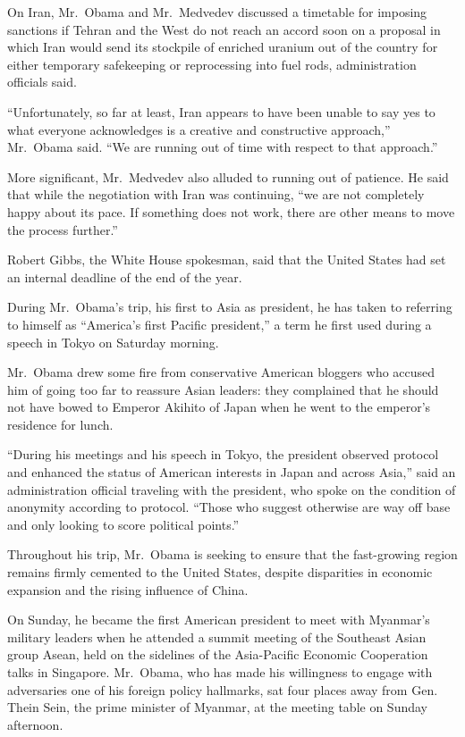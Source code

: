 ﻿\documentclass[12pt]{article}
\begin{document}
On Iran, Mr.~Obama and Mr.~Medvedev discussed a timetable for imposing sanctions if Tehran and the
West do not reach an accord soon on a proposal in which Iran would send its stockpile of enriched
uranium out of the country for either temporary safekeeping or reprocessing into fuel rods,
administration officials said.

``Unfortunately, so far at least, Iran appears to have been unable to say yes to what everyone
acknowledges is a creative and constructive approach,'' Mr.~Obama said. ``We are running out of time
with respect to that approach.''

More significant, Mr.~Medvedev also alluded to running out of patience. He said that while the
negotiation with Iran was continuing, ``we are not completely happy about its pace. If something
does not work, there are other means to move the process further.''

Robert Gibbs, the White House spokesman, said that the United States had set an internal deadline of
the end of the year.

During Mr.~Obama's trip, his first to Asia as president, he has taken to referring to himself as
``America's first Pacific president,'' a term he first used during a speech in Tokyo on Saturday
morning.

Mr.~Obama drew some fire from conservative American bloggers who accused him of going too far to
reassure Asian leaders: they complained that he should not have bowed to Emperor Akihito of Japan
when he went to the emperor's residence for lunch.

``During his meetings and his speech in Tokyo, the president observed protocol and enhanced the
status of American interests in Japan and across Asia,'' said an administration official traveling
with the president, who spoke on the condition of anonymity according to protocol. ``Those who
suggest otherwise are way off base and only looking to score political points.''

Throughout his trip, Mr.~Obama is seeking to ensure that the fast-growing region remains firmly
cemented to the United States, despite disparities in economic expansion and the rising influence of
China.

On Sunday, he became the first American president to meet with Myanmar's military leaders when he
attended a summit meeting of the Southeast Asian group Asean, held on the sidelines of the
Asia-Pacific Economic Cooperation talks in Singapore. Mr.~Obama, who has made his willingness to
engage with adversaries one of his foreign policy hallmarks, sat four places away from Gen. Thein
Sein, the prime minister of Myanmar, at the meeting table on Sunday afternoon.
\end{document}
